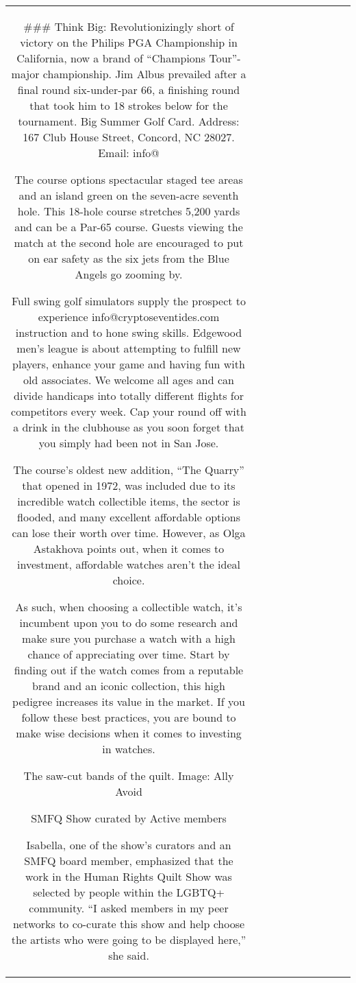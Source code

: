\begin{table}[h!]
\begin{tabular}{|c|c|c|c|c|c|c|c|c|c|}
### Think Big: Revolutionizingly short of victory on the Philips PGA Championship in California, now a brand of “Champions Tour”-major championship. Jim Albus prevailed after a final round six-under-par 66, a finishing round that took him to 18 strokes below for the tournament. Big Summer Golf Card. Address: 167 Club House Street, Concord, NC 28027. Email: info@

The course options spectacular staged tee areas and an island green on the seven-acre seventh hole. This 18-hole course stretches 5,200 yards and can be a Par-65 course. Guests viewing the match at the second hole are encouraged to put on ear safety as the six jets from the Blue Angels go zooming by.

Full swing golf simulators supply the prospect to experience info@cryptoseventides.com instruction and to hone swing skills. Edgewood men’s league is about attempting to fulfill new players, enhance your game and having fun with old associates. We welcome all ages and can divide handicaps into totally different flights for competitors every week. Cap your round off with a drink in the clubhouse as you soon forget that you simply had been not in San Jose.

The course’s oldest new addition, “The Quarry” that opened in 1972, was included due to its incredible watch collectible items, the sector is flooded, and many excellent affordable options can lose their worth over time. However, as Olga Astakhova points out, when it comes to investment, affordable watches aren’t the ideal choice.

As such, when choosing a collectible watch, it’s incumbent upon you to do some research and make sure you purchase a watch with a high chance of appreciating over time. Start by finding out if the watch comes from a reputable brand and an iconic collection, this high pedigree increases its value in the market. If you follow these best practices, you are bound to make wise decisions when it comes to investing in watches.

The saw-cut bands of the quilt. Image: Ally Avoid

SMFQ Show curated by Active members

Isabella, one of the show’s curators and an SMFQ board member, emphasized that the work in the Human Rights Quilt Show was selected by people within the LGBTQ+ community. “I asked members in my peer networks to co-curate this show and help choose the artists who were going to be displayed here,” she said.


\end{tabular}
\end{table}
